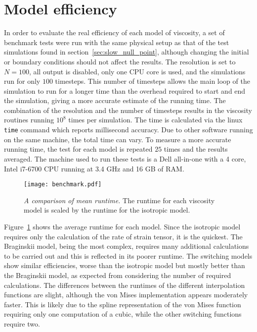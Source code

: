 \section{Model efficiency}

In order to evaluate the real efficiency of each model of viscosity, a set of benchmark tests were run with the same physical setup as that of the test simulations found in section~\ref{sec:slow_null_point}, although changing the initial or boundary conditions should not affect the results. The resolution is set to $N=100$, all output is disabled, only one CPU core is used, and the simulations run for only $100$ timesteps. This number of timesteps allows the main loop of the simulation to run for a longer time than the overhead required to start and end the simulation, giving a more accurate estimate of the running time. The combination of the resolution and the number of timesteps results in the viscosity routines running $10^{8}$ times per simulation. The time is calculated via the linux \verb|time| command which reports millisecond accuracy. Due to other software running on the same machine, the total time can vary. To measure a more accurate running time, the test for each model is repeated $25$ times and the results averaged. The machine used to run these tests is a Dell all-in-one with a 4 core, Intel i7-6700 CPU running at 3.4 GHz and 16 GB of RAM. 

\begin{figure}[t]
  \centering
  \texttt{[image: benchmark.pdf]}
  \caption{\emph{A comparison of mean runtime.} The runtime for each viscosity model is scaled by the runtime for the isotropic model.}%
  \label{fig:benchmark}
\end{figure}

Figure~\ref{fig:benchmark} shows the average runtime for each model. Since the isotropic model requires only the calculation of the rate of strain tensor, it is the quickest. The Braginskii model, being the most complex, requires many additional calculations to be carried out and this is reflected in its poorer runtime. The switching models show similar efficiencies, worse than the isotropic model but mostly better than the Braginskii model, as expected from considering the number of required calculations. The differences between the runtimes of the different interpolation functions are slight, although the von Mises implementation appears moderately faster. This is likely due to the spline representation of the von Mises function requiring only one computation of a cubic, while the other switching functions require two.

